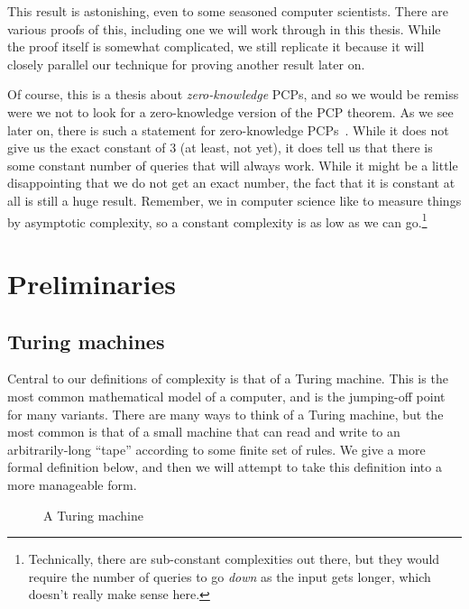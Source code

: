 \documentclass[english,12pt]{reedthesis}
\theoremstyle{plain}
\theoremstyle{definition}
\theoremstyle{remark}
\begin{document}
This result is astonishing, even to some seasoned computer scientists. There are
various proofs of this, including one we will work through in this thesis. While
the proof itself is somewhat complicated, we still replicate it because it will
closely parallel our technique for proving another result later on.

Of course, this is a thesis about \emph{zero-knowledge} PCPs, and so we would be
remiss were we not to look for a zero-knowledge version of the PCP theorem. As
we see later on, there is such a statement for zero-knowledge PCPs~\cite{GOS25}.
While it does not give us the exact constant of 3 (at least, not yet), it does
tell us that there is some constant number of queries that will always work.
While it might be a little disappointing that we do not get an exact number, the
fact that it is constant at all is still a huge result. Remember, we in computer
science like to measure things by asymptotic complexity, so a constant
complexity is as low as we can go.\footnote{Technically, there are sub-constant
  complexities out there, but they would require the number of queries to go
  \emph{down} as the input gets longer, which doesn't really make sense here.}

\chapter{Preliminaries}

\section{Turing machines}

Central to our definitions of complexity is that of a Turing machine. This is
the most common mathematical model of a computer, and is the jumping-off point
for many variants. There are many ways to think of a Turing machine, but the
most common is that of a small machine that can read and write to an
arbitrarily-long ``tape'' according to some finite set of rules. We give a more
formal definition below, and then we will attempt to take this definition into a
more manageable form.

\begin{figure}[htbp]
  \centering
  \caption{A Turing machine}\label{fig:tm}
\end{figure}
\end{document}
